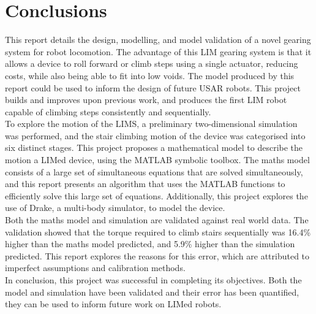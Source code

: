 \chapter{Conclusions}

This report details the design, modelling, and model validation of a novel gearing system for robot locomotion. The advantage of this LIM gearing system is that it allows a device to roll forward or climb steps using a single actuator, reducing costs, while also being able to fit into low voids. The model produced by this report could be used to inform the design of future USAR robots. This project builds and improves upon previous work, and produces the first LIM robot capable of climbing steps consistently and sequentially. \\

To explore the motion of the LIMS, a preliminary two-dimensional simulation was performed, and the stair climbing motion of the device was categorised into six distinct stages. This project proposes a mathematical model to describe the motion a LIMed device, using the MATLAB symbolic toolbox. The maths model consists of a large set of simultaneous equations that are solved simultaneously, and this report presents an algorithm that uses the MATLAB functions to efficiently solve this large set of equations. Additionally, this project explores the use of Drake, a multi-body simulator, to model the device. \\

Both the maths model and simulation are validated against real world data. The validation showed that the torque required to climb stairs sequentially was 16.4\% higher than the maths model predicted, and 5.9\% higher than the simulation predicted. This report explores the reasons for this error, which are attributed to imperfect assumptions and calibration methods.\\

In conclusion, this project was successful in completing its objectives. Both the model and simulation have been validated and their error has been quantified, they can be used to inform future work on LIMed robots.